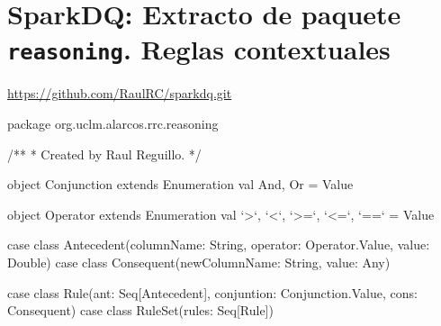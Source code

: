\chapter{SparkDQ: Extracto de paquete \texttt{reasoning}. Reglas contextuales}
\label{reasoning-rule}

\url{https://github.com/RaulRC/sparkdq.git}


\begin{listing}[
  language = scala,
  numbers=left,
  numberstyle=\tiny,
  stepnumber=5,
  numbersep=5pt,
  frame=single,
  caption  = {SparkDQ: Formalización de reglas en SparkDQ},
  label    = code:sparkdq.reasoning]
package org.uclm.alarcos.rrc.reasoning

/**
  * Created by Raul Reguillo. 
  */

object Conjunction extends Enumeration {
  val And, Or = Value
}

object Operator extends Enumeration {
  val `>`, `<`, `>=`, `<=`, `==` = Value
}

case class Antecedent(columnName: String, operator: Operator.Value, value: Double)
case class Consequent(newColumnName: String, value: Any)

case class Rule(ant: Seq[Antecedent], conjuntion: Conjunction.Value, cons: Consequent)
case class RuleSet(rules: Seq[Rule])
\end{listing}
